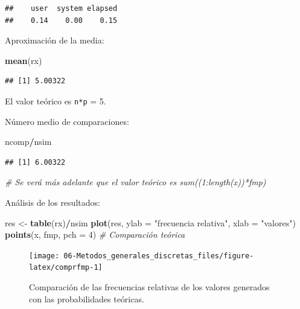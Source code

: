\documentclass[
]{book}
\newenvironment{Shaded}{\begin{snugshade}}{\end{snugshade}}
\newcommand{\CommentTok}[1]{\textcolor[rgb]{0.56,0.35,0.01}{\textit{#1}}}
\newcommand{\DataTypeTok}[1]{\textcolor[rgb]{0.13,0.29,0.53}{#1}}
\newcommand{\DecValTok}[1]{\textcolor[rgb]{0.00,0.00,0.81}{#1}}
\newcommand{\KeywordTok}[1]{\textcolor[rgb]{0.13,0.29,0.53}{\textbf{#1}}}
\newcommand{\NormalTok}[1]{#1}
\newcommand{\OperatorTok}[1]{\textcolor[rgb]{0.81,0.36,0.00}{\textbf{#1}}}
\newcommand{\StringTok}[1]{\textcolor[rgb]{0.31,0.60,0.02}{#1}}
\theoremstyle{break}
\theoremstyle{definition}
\theoremstyle{definition}
\theoremstyle{definition}
\theoremstyle{remark}
\begin{document}
\begin{verbatim}
##    user  system elapsed 
##    0.14    0.00    0.15
\end{verbatim}

Aproximación de la media:

\begin{Shaded}
\begin{Highlighting}[]
\KeywordTok{mean}\NormalTok{(rx)}
\end{Highlighting}
\end{Shaded}

\begin{verbatim}
## [1] 5.00322
\end{verbatim}

El valor teórico es \texttt{n*p} = 5.

Número medio de comparaciones:

\begin{Shaded}
\begin{Highlighting}[]
\NormalTok{ncomp}\OperatorTok{/}\NormalTok{nsim}
\end{Highlighting}
\end{Shaded}

\begin{verbatim}
## [1] 6.00322
\end{verbatim}

\begin{Shaded}
\begin{Highlighting}[]
\CommentTok{# Se verá más adelante que el valor teórico es sum((1:length(x))*fmp)}
\end{Highlighting}
\end{Shaded}

Análisis de los resultados:

\begin{Shaded}
\begin{Highlighting}[]
\NormalTok{res <-}\StringTok{ }\KeywordTok{table}\NormalTok{(rx)}\OperatorTok{/}\NormalTok{nsim}
\KeywordTok{plot}\NormalTok{(res, }\DataTypeTok{ylab =} \StringTok{"frecuencia relativa"}\NormalTok{, }\DataTypeTok{xlab =} \StringTok{"valores"}\NormalTok{)}
\KeywordTok{points}\NormalTok{(x, fmp, }\DataTypeTok{pch =} \DecValTok{4}\NormalTok{)  }\CommentTok{# Comparación teórica}
\end{Highlighting}
\end{Shaded}

\begin{figure}[!htb]

{\centering \texttt{[image: 06-Metodos\_generales\_discretas\_files/figure-latex/comprfmp-1]} 

}

\caption{Comparación de las frecuencias relativas de los valores generados con las probabilidades teóricas.}\label{fig:comprfmp}
\end{figure}
\end{document}
